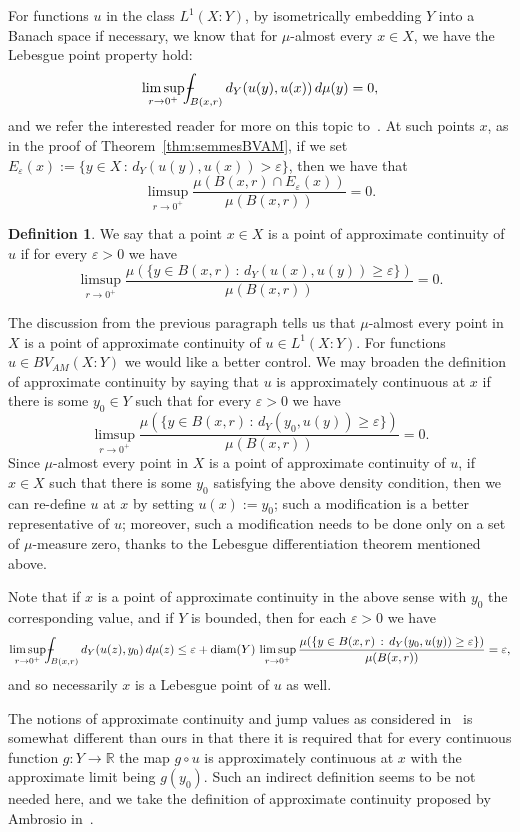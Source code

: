 \documentclass[11pt, letterpaper]{amsart} %
\newcommand*{\R}{{\mathbb R}}
\newcommand*{\eps}{\varepsilon}
\providecommand*{\vint}[1]{\mathchoice
          {\mathop{\vrule width 5pt height 3 pt depth -2.5pt
                  \kern -9pt \kern 1pt\intop}\nolimits_{\kern -5pt{#1}}}
          {\mathop{\vrule width 5pt height 3 pt depth -2.6pt
                  \kern -6pt \intop}\nolimits_{\kern -3pt{#1}}}
          {\mathop{\vrule width 5pt height 3 pt depth -2.6pt
                  \kern -6pt \intop}\nolimits_{\kern -3pt{#1}}}
          {\mathop{\vrule width 5pt height 3 pt depth -2.6pt
                  \kern -6pt \intop}\nolimits_{\kern -3pt{#1}}}}
\DeclareMathOperator{\diam}{diam}
\numberwithin{equation}{section}
\theoremstyle{plain}
\theoremstyle{definition}
\newtheorem{definition}[equation]{Definition}
\begin{document}
{For functions $u$ in the class $L^1(X:Y)$, by isometrically embedding $Y$ into a Banach space if necessary, we know that
for $\mu$-almost every $x\in X$, we have the Lebesgue point property hold:
\[
\limsup_{r\to 0^+}\vint{B(x,r)}d_Y(u(y),u(x))\, d\mu(y)=0,
\]
and we refer the interested reader for more on this topic to~\cite[Page~77]{HKSTbook}. At such points $x$, as in the proof of
Theorem~\ref{thm:semmesBVAM}, if we set $E_\eps(x):=\{y\in X\, :\, d_Y(u(y),u(x))>\eps\}$, then
we have that
\[
\limsup_{r\to 0^+}\frac{\mu(B(x,r)\cap E_\eps(x))}{\mu(B(x,r))}=0.
\]

\begin{definition}\label{def:AppCont}
We say that a point $x\in X$ is a point of approximate continuity of $u$ if for every $\eps>0$ we have
\[
\limsup_{r\to 0^+}\frac{\mu(\{y\in B(x,r)\, :\, d_Y(u(x),u(y))\ge \eps\})}{\mu(B(x,r))}=0.
\]
\end{definition}

The discussion from the previous paragraph tells us that $\mu$-almost every point in $X$ is a point of approximate
continuity of $u\in L^1(X:Y)$. For functions $u\in BV_{AM}(X:Y)$ we would like a better control. We may broaden
the definition of approximate continuity by saying that $u$ is approximately continuous at $x$ if there is some $y_0\in Y$
such that for every $\eps>0$ we have
\[
\limsup_{r\to 0^+}\frac{\mu(\{y\in B(x,r)\, :\, d_Y(y_0,u(y))\ge \eps\})}{\mu(B(x,r))}=0.
\]
Since $\mu$-almost every point in $X$ is a point of approximate continuity of $u$, if $x\in X$ such that there is some
$y_0$ satisfying the above density condition, then we can re-define $u$ at $x$ by setting $u(x):=y_0$; such a
modification is a better representative of $u$; moreover, such a modification needs to be done only on a set of
$\mu$-measure zero, thanks to the Lebesgue differentiation theorem mentioned above.

Note that if $x$ is a point of approximate continuity in the above sense with $y_0$ the corresponding value,
and if $Y$ is bounded, 
then for each $\eps>0$ we have 
\begin{align*}
\limsup_{r\to 0^+}\vint{B(x,r)}d_Y(u(z),y_0)\, d\mu(z)
\le \eps+\diam(Y)\, \limsup_{r\to 0^+}\frac{\mu(\{y\in B(x,r)\, :\, d_Y(y_0,u(y))\ge \eps\})}{\mu(B(x,r))}
=\eps,
\end{align*}
and so necessarily $x$ is a Lebesgue point of $u$ as well.

The notions of approximate continuity and jump values as considered 
in~\cite[page~294]{Ambrosio1990} is somewhat different than ours in that there it is required that for every
continuous function $g:Y\to\R$ the map $g\circ u$ is approximately continuous at $x$ with the approximate
limit being $g(y_0)$. Such an indirect definition seems to be not needed here, and we take the definition 
of approximate continuity proposed by Ambrosio in~\cite[Definition~1.1]{Ambrosio1990-II}.

}
\end{document}
